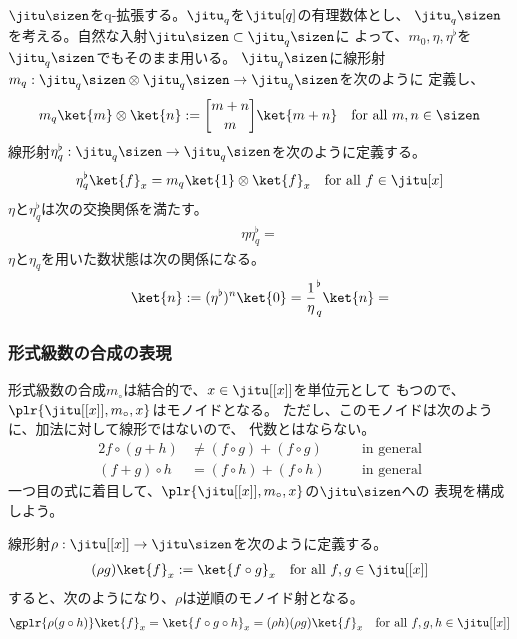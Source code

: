 {	$\jitu\sizen$をq-拡張する。$\jitu_q$を$\jitu[q]$の有理数体とし、
	$\jitu_q\sizen$を考える。自然な入射$\jitu\sizen\subset\jitu_q\sizen$に
	よって、$m_0,\eta,\eta^\flat$を$\jitu_q\sizen$でもそのまま用いる。
	$\jitu_q\sizen$に線形射
	$m_q:\jitu_q\sizen\otimes\jitu_q\sizen\to\jitu_q\sizen$を次のように
	定義し、
	\begin{equation*}\begin{split}
		m_q\ket{m}\otimes\ket{n} := \qbinom{m+n}{m}\ket{m+n}
		\quad\text{for all } m,n\in\sizen
	\end{split}\end{equation*}
	線形射$\eta_q^\flat:\jitu_q\sizen\to\jitu_q\sizen$を次のように定義する。
	\begin{equation*}\begin{split}
		\eta_q^\flat\ket{f}_x = m_q\ket{1}\otimes\ket{f}_x
		\quad\text{for all } f\in\jitu[x]
	\end{split}\end{equation*}
	$\eta$と$\eta_q^\flat$は次の交換関係を満たす。
	\begin{equation*}\begin{split}
		\eta\eta_q^\flat = 
	\end{split}\end{equation*}
	$\eta$と$\eta_q$を用いた数状態は次の関係になる。
	\begin{equation*}\begin{split}
		\ket{n} := (\eta^\flat)^n\ket{0} = \frac{1}
		\eta_q^\flat\ket{n} = 
	\end{split}\end{equation*}
\subsubsection{形式級数の合成の表現}\label{s3:形式級数の合成の表現} %
	形式級数の合成$m_\circ$は結合的で、$x\in\jitu[[x]]$を単位元として
	もつので、$\plr{\jitu[[x]],m_\circ,x}$はモノイドとなる。
	ただし、このモノイドは次のように、加法に対して線形ではないので、
	代数とはならない。
	\begin{alignat*}{2}
		f\circ(g + h) &\neq (f\circ g) + (f\circ g) &&\quad\text{in general} \\
		(f + g)\circ h &= (f\circ h) + (f\circ h) &&\quad\text{in general}
	\end{alignat*}
	一つ目の式に着目して、$\plr{\jitu[[x]],m_\circ,x}$の$\jitu\sizen$への
	表現を構成しよう。

	線形射$\rho:\jitu[[x]]\to\jitu\sizen$を次のように定義する。
	\begin{equation*}\begin{split}
		(\rho g)\ket{f}_x := \ket{f\circ g}_x
		\quad\text{for all } f,g\in\jitu[[x]]
	\end{split}\end{equation*}
	すると、次のようになり、$\rho$は逆順のモノイド射となる。
	\begin{equation*}\begin{split}
		\gplr{\rho(g\circ h)}\ket{f}_x = \ket{f\circ g\circ h}_x 
		= (\rho h)(\rho g)\ket{f}_x
		\quad\text{for all } f,g,h\in\jitu[[x]]
	\end{split}\end{equation*}

}
